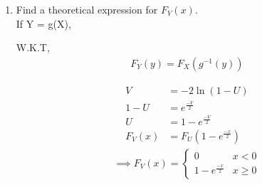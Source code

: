 \documentclass[journal,12pt,twocolumn]{IEEEtran}
\renewcommand\thesection{\arabic{section}}
\begin{document}
\begin{enumerate}[label=\thesection.\arabic*
,ref=\thesection.\theenumi]
\item Find a theoretical expression for $F_V(x)$.\\
\solution
If Y = g(X), 

W.K.T,
\begin{align}
  F_Y(y) = F_X(g^{-1}(y))  
\end{align}

\begin{align}
V &= -2\ln{(1-U)} \\
1-U &= e^{\frac{-V}{2}}\\
U &= 1 - e^{\frac{-V}{2}} \\ 
F_V(x) &= F_U(1 - e^{\frac{-x}{2}}) 
\end{align}
 \begin{align}
\implies
  F_V(x)=
  \begin{cases}
   0                         & x < 0 \\
	1 - e^{\frac{-x}{2}} & x \geq 0
	\end{cases}
 \end{align}
\end{enumerate}

\end{document}

